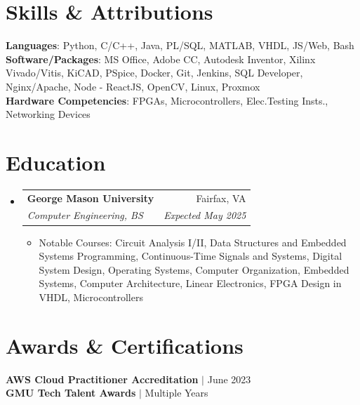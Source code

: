 \documentclass[letterpaper,11pt]{article}
\makeatletter
\newcommand{\resumeItem}[1]{
  \item\small{
    {#1 \vspace{-1pt}}
  }
}
\newcommand{\resumeSubheading}[4]{
  \vspace{-1pt}\item
    \begin{tabular*}{0.97\textwidth}[t]{l@{\extracolsep{\fill}}r}
      \textbf{#1} & #2 \\
      \textit{\small#3} & \textit{\small #4} \\
    \end{tabular*}\vspace{-5pt}
}
\newcommand{\resumeSubHeadingListStart}{\begin{itemize}[leftmargin=0.15in, label={}]}
\newcommand{\resumeSubHeadingListEnd}{\end{itemize}}
\newcommand{\resumeItemListStart}{\begin{itemize}}
\newcommand{\resumeItemListEnd}{\end{itemize}\vspace{-5pt}}
\makeatother
\begin{document}
\section{Skills \& Attributions}
 \begin{itemize}[leftmargin=0.15in, label={}]
    \small{\item{
     \textbf{Languages}{: Python, C/C++, Java, PL/SQL, MATLAB, VHDL, JS/Web, Bash} \\
     \textbf{Software/Packages}{: MS Office, Adobe CC, Autodesk Inventor, Xilinx Vivado/Vitis, KiCAD, PSpice, Docker, Git, Jenkins, SQL Developer, Nginx/Apache, Node - ReactJS, OpenCV, Linux, Proxmox} \\
     \textbf{Hardware Competencies}{: FPGAs, Microcontrollers, Elec.Testing Insts., Networking Devices} \\
    }}
 \end{itemize}

\section{Education}
  \resumeSubHeadingListStart
    \resumeSubheading
      {George Mason University}{Fairfax, VA}
      {Computer Engineering, BS}{Expected May 2025}
          \resumeItemListStart
            \resumeItem{Notable Courses: Circuit Analysis I/II, Data Structures and Embedded Systems Programming, Continuous-Time Signals and Systems, Digital System Design, Operating Systems, Computer Organization, Embedded Systems, Computer Architecture, Linear Electronics, FPGA Design in VHDL, Microcontrollers}
            
        \resumeItemListEnd

  \resumeSubHeadingListEnd

\section{Awards \& Certifications}
 \begin{itemize}[leftmargin=0.15in, label={}]
    \small{\item{
     {\textbf{AWS Cloud Practitioner Accreditation} $|$ {June 2023}} \\ 
     {\textbf{GMU Tech Talent Awards} $|$ {Multiple Years}}
    }}
 \end{itemize}

\end{document}
